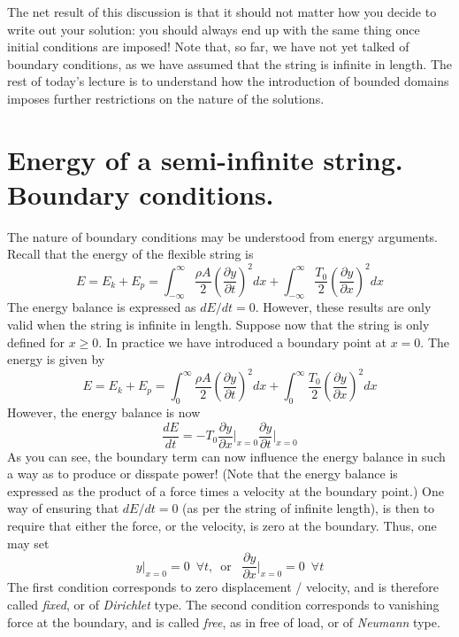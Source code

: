 \medskip \medskip 

\noindent
The net result of this discussion is that it should not matter how you decide to write out your solution: you should always end up with the same thing once initial conditions are imposed! Note that, so far, we have not yet talked of boundary conditions, as we have assumed that the string is infinite in length. The rest of today's lecture is to understand how the introduction of bounded domains imposes further restrictions on the nature of the solutions. 



\section{Energy of a semi-infinite string. Boundary conditions.}\label{sec:WaveEquationsBCs}



The nature of boundary conditions may be understood from energy arguments. Recall  that the energy of the flexible string is 
\begin{equation}
E = E_k + E_p = \int_{-\infty}^{\infty} \frac{\rho A}{2}\left( \frac{\partial y}{\partial t} \right)^2 dx + \int_{-\infty}^{\infty} \frac{T_0}{2}\left( \frac{\partial y}{\partial x} \right)^2 dx
\end{equation}
The energy balance is expressed as $dE/dt = 0$. However, these results are only valid when the string is infinite in length. Suppose now that the string is only defined for $x\geq 0$. In practice we have introduced a boundary point at $x=0.$ The energy is given by
\begin{equation}\label{eq:EnHalf}
E = E_k + E_p = \int_{0}^{\infty} \frac{\rho A}{2}\left( \frac{\partial y}{\partial t} \right)^2 dx + \int_{0}^{\infty} \frac{T_0}{2}\left( \frac{\partial y}{\partial x} \right)^2 dx
\end{equation}
However, the energy balance is now
\begin{equation}\label{eq:EnBal}
\frac{dE}{dt} = - T_0 \frac{\partial y}{\partial x }\Bigg|_{x=0}\frac{\partial y}{\partial t }\Bigg|_{x=0}
\end{equation}
As you can see, the boundary term can now influence the energy balance in such a way as to produce or disspate power! (Note that the energy balance is expressed as the product of a force times a velocity at the boundary point.) One way of ensuring that $dE/dt = 0$ (as per the string of infinite length), is then to require that either the force, or the velocity, is zero at the boundary. Thus, one may set
\begin{equation}
y\big|_{x=0} = 0 \,\,\, \forall t, \,\,\, \text{or } \,\,\, \frac{\partial y}{\partial x }\Bigg|_{x=0} = 0 \,\,\, \forall t
\end{equation}
The first condition corresponds to zero displacement / velocity, and is therefore called \emph{fixed}, or of \emph{Dirichlet} type. The second condition corresponds to vanishing force at the boundary, and is called \emph{free}, as in free of load, or of \emph{Neumann} type. 
\medskip \medskip 

